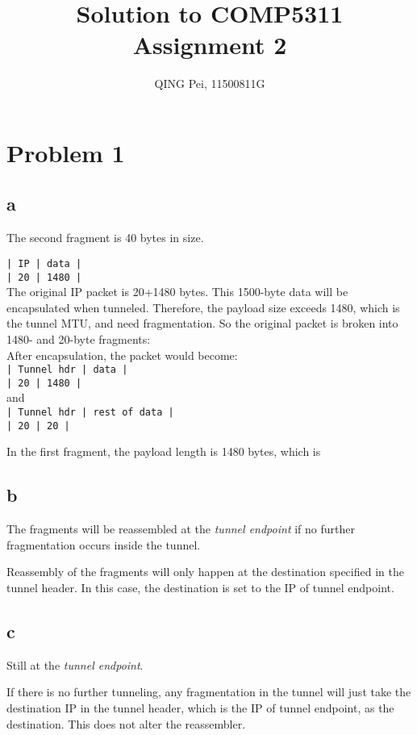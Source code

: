 \documentclass[11pt]{article}
\title{Solution to COMP5311 Assignment 2}
\author{QING Pei, 11500811G}
\begin{document}
\maketitle

\section{Problem 1}
\subsection{a}
The second fragment is 40 bytes in size.

\texttt{| IP | data |}\\
\texttt{| 20 | 1480 |}\\
The original IP packet is 20+1480 bytes. This 1500-byte data will be encapsulated when tunneled. Therefore, the payload size exceeds 1480, which is the tunnel MTU, and need fragmentation. 
So the original packet is broken into 1480- and 20-byte fragments:\\

After encapsulation, the packet would become:\\
\texttt{| Tunnel hdr  | data |}\\
\texttt{| 20 | 1480 |}\\
and\\
\texttt{| Tunnel hdr | rest of data |}\\
\texttt{| 20 | 20 |}

In the first fragment, the payload length is 1480 bytes, which is

\subsection{b}
The fragments will be reassembled at the \emph{tunnel endpoint} if no further fragmentation occurs inside the tunnel.

Reassembly of the fragments will only happen at the destination specified in the tunnel header. In this case, the destination is set to the IP of tunnel endpoint.

\subsection{c}
Still at the \emph{tunnel endpoint}.

If there is no further tunneling, any fragmentation in the tunnel will just take the destination IP in the tunnel header, which is the IP of tunnel endpoint, as the destination. This does not alter the reassembler.
\end{document}
